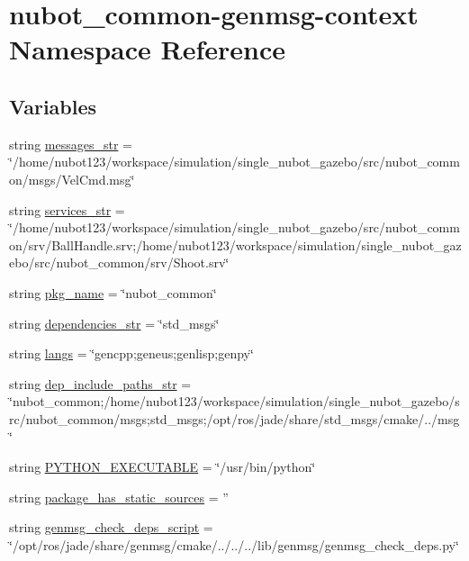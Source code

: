 \hypertarget{namespacenubot__common-genmsg-context}{\section{nubot\-\_\-common-\/genmsg-\/context Namespace Reference}
\label{namespacenubot__common-genmsg-context}
}
\subsection*{Variables}
\begin{DoxyCompactItemize}
\item 
string \hyperlink{namespacenubot__common-genmsg-context_a9d82d20e4ffa677c598751d6630dc734}{messages\-\_\-str} = \char`\"{}/home/nubot123/workspace/simulation/single\-\_\-nubot\-\_\-gazebo/src/nubot\-\_\-common/msgs/Vel\-Cmd.\-msg\char`\"{}
\item 
string \hyperlink{namespacenubot__common-genmsg-context_a1e2a824c1778c805a4593863a72ba35e}{services\-\_\-str} = \char`\"{}/home/nubot123/workspace/simulation/single\-\_\-nubot\-\_\-gazebo/src/nubot\-\_\-common/srv/Ball\-Handle.\-srv;/home/nubot123/workspace/simulation/single\-\_\-nubot\-\_\-gazebo/src/nubot\-\_\-common/srv/Shoot.\-srv\char`\"{}
\item 
string \hyperlink{namespacenubot__common-genmsg-context_aa7e82af182943505146665259b8e1ce9}{pkg\-\_\-name} = \char`\"{}nubot\-\_\-common\char`\"{}
\item 
string \hyperlink{namespacenubot__common-genmsg-context_acb3057b57eb9458421378baa13f383d0}{dependencies\-\_\-str} = \char`\"{}std\-\_\-msgs\char`\"{}
\item 
string \hyperlink{namespacenubot__common-genmsg-context_ad47fe39b5ca574c609a0a44451d67ebe}{langs} = \char`\"{}gencpp;geneus;genlisp;genpy\char`\"{}
\item 
string \hyperlink{namespacenubot__common-genmsg-context_a3cb8468ce84e82ac5e2b66290f260f4c}{dep\-\_\-include\-\_\-paths\-\_\-str} = \char`\"{}nubot\-\_\-common;/home/nubot123/workspace/simulation/single\-\_\-nubot\-\_\-gazebo/src/nubot\-\_\-common/msgs;std\-\_\-msgs;/opt/ros/jade/share/std\-\_\-msgs/cmake/../msg\char`\"{}
\item 
string \hyperlink{namespacenubot__common-genmsg-context_a07f30a33447f3b83a20605f1732e2763}{P\-Y\-T\-H\-O\-N\-\_\-\-E\-X\-E\-C\-U\-T\-A\-B\-L\-E} = \char`\"{}/usr/bin/python\char`\"{}
\item 
string \hyperlink{namespacenubot__common-genmsg-context_a9b23bed4614ce829e09eb98736bbcfb6}{package\-\_\-has\-\_\-static\-\_\-sources} = ''
\item 
string \hyperlink{namespacenubot__common-genmsg-context_a32a0523eb31dd66d816b3d32bd6aa2b5}{genmsg\-\_\-check\-\_\-deps\-\_\-script} = \char`\"{}/opt/ros/jade/share/genmsg/cmake/../../../lib/genmsg/genmsg\-\_\-check\-\_\-deps.\-py\char`\"{}
\end{DoxyCompactItemize}


